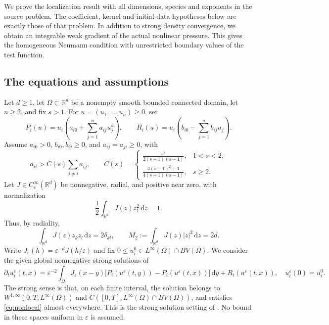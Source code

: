 \documentclass[11pt]{article}
\newcommand{\R}{\mathbb R}
\newcommand{\eps}{\varepsilon}
\newcommand{\dd}{\,\mathrm d}
\newcommand{\Om}{\Omega}
\begin{document}
We prove the localization result with all dimensions, species and exponents
in the source problem. The coefficient, kernel and initial-data hypotheses
below are exactly those of that problem. In addition to strong density
convergence, we obtain an integrable weak gradient of the actual nonlinear
pressure. This gives the homogeneous Neumann condition with unrestricted
boundary values of the test function.

\subsection{The equations and assumptions}

Let $d\geq1$, let $\Om\subset\R^d$ be a nonempty smooth bounded connected
domain, let $n\geq2$, and fix $s>1$. For $u=(u_1,\ldots,u_n)\geq0$, set
\begin{equation}\label{eq:PR}
 P_i(u)=u_i\left(a_{i0}+\sum_{j=1}^n a_{ij}u_j^s\right),
 \qquad R_i(u)=u_i\left(b_{i0}-\sum_{j=1}^n b_{ij}u_j\right).
\end{equation}
Assume $a_{i0}>0$, $b_{i0},b_{ij}\geq0$, and
$a_{ij}=a_{ji}\geq0$, with
\begin{equation}\label{eq:dominance}
 a_{ii}>C(s)\sum_{j\ne i}a_{ij},\qquad
 C(s)=\begin{cases}
 \displaystyle\frac{s^2}{2(s+1)(s-1)},&1<s<2,\\[4pt]
 \displaystyle\frac{4(s-1)^2+1}{4(s+1)(s-1)},&s\geq2.
 \end{cases}
\end{equation}
Let $J\in C_c^\infty(\R^d)$ be nonnegative, radial, and positive near zero,
with normalization
\[
 \frac12\int_{\R^d}J(z)z_1^2\dd z=1.
\]
Thus, by radiality,
\begin{equation}\label{eq:moment}
 \int_{\R^d}J(z)z_kz_l\dd z=2\delta_{kl},\qquad
 M_2:=\int_{\R^d}J(z)|z|^2\dd z=2d.
\end{equation}
Write $J_\eps(h)=\eps^{-d}J(h/\eps)$ and fix
$0\leq u_i^0\in L^\infty(\Om)\cap BV(\Om)$.
We consider the given global nonnegative strong solutions of
\begin{equation}\label{eq:nonlocal}
 \partial_tu_i^\eps(t,x)=\eps^{-2}\int_\Om J_\eps(x-y)
 \bigl[P_i(u^\eps(t,y))-P_i(u^\eps(t,x))\bigr]\dd y
 +R_i(u^\eps(t,x)),\quad u_i^\eps(0)=u_i^0.
\end{equation}
The strong sense is that, on each finite interval, the solution belongs to
$W^{1,\infty}(0,T;L^\infty(\Om))$ and
$C([0,T];L^\infty(\Om)\cap BV(\Om))$, and satisfies
\eqref{eq:nonlocal} almost everywhere. This is the strong-solution setting
of \cite[Theorem 1]{HJP}. No bound in these spaces uniform in $\eps$ is assumed.
\end{document}
